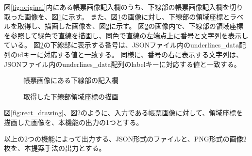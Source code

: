 図\ref{fig:original}内にある帳票画像記入欄のうち、下線部の帳票画像記入欄を切り取った画像を、図\ref{fig:underline_original}に示す。
また、図\ref{fig:underline_original}の画像に対し、下線部の領域座標とラベルを取得し、描画した画像を、図\ref{fig:underline_drawing}に示す。
図\ref{fig:underline_drawing}の画像内で、下線部の領域座標を参照して緑色で直線を描画し、同色で直線の左端点上に番号と文字列を表示している。
図\ref{fig:underline_drawing}の下線部に表示する番号は、JSONファイル内のunderlines\_data配列のidキーに対応する値と一致する。
同様に、番号の右に表示する文字列は、JSONファイル内のunderlines\_data配列のlabelキーに対応する値と一致する。

\begin{figure}[t]
    \begin{center}
        \caption{帳票画像にある下線部の記入欄}
        \label{fig:underline_original}
    \end{center}
\end{figure}

\begin{figure}[t]
    \begin{center}
        \caption{取得した下線部領域座標の描画}
        \label{fig:underline_drawing}
    \end{center}
\end{figure}

図\ref{fig:rect_drawing}、図\ref{fig:underline_drawing}のように、入力である帳票画像に対して、領域座標を描画した画像を、本機能の出力の1つとする。

以上の2つの機能によって出力する、JSON形式のファイルと、PNG形式の画像2枚を、本提案手法の出力とする。

